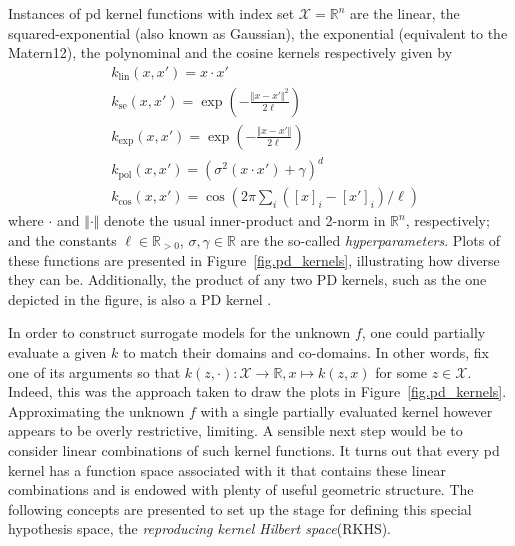 Instances of \ac{pd} kernel functions with index set $\mathcal{X} = \mathbb{R}^n$ are the linear, the squared-exponential (also known as Gaussian), the exponential (equivalent to the Matern12), the polynominal and the cosine kernels respectively given by
\begin{align}
	&k_\text{lin}(x,x') = x \cdot x' \\
	&k_\text{se}(x,x') = \exp\left(-\frac{\Vert x-x'\Vert^2}{2\ell}\right) \label{eq.se_kernel}\\
	&k_\text{exp}(x,x') = \exp\left(-\frac{\Vert x-x'\Vert}{2\ell}\right) \\
	&k_\text{pol}(x,x') = \left(\sigma^2 (x \cdot x') + \gamma \right)^d \\
	&k_\text{cos}(x,x') = \cos\left(2\pi \sum_i ([x]_i-[x']_i)/\ell \right)
\end{align}
where $\cdot$ and $\Vert \cdot \Vert$ denote the usual inner-product  and 2-norm in $\mathbb{R}^n$, respectively; and the constants $\ell \in \mathbb{R}_{>0}$, $\sigma, \gamma\in \mathbb{R}$ are the so-called \textit{hyperparameters}. Plots of these functions are presented in Figure~\ref{fig.pd_kernels}, illustrating how diverse they can be. Additionally, the product of any two PD kernels, such as the one depicted in the figure, is also a PD kernel \citep{scholkopf2002learning}. %

In order to construct surrogate models for the unknown $f$, one could partially evaluate a given $k$ to match their domains and co-domains. In other words, fix one of its arguments so that $k(z,\cdot): \mathcal{X} \rightarrow \mathbb{R}, x \mapsto k(z,x)$ for some $z \in \mathcal{X}$. Indeed, this was the approach taken to draw the plots in Figure~\ref{fig.pd_kernels}. Approximating the unknown $f$ with a single partially evaluated kernel however appears to be overly restrictive, limiting. A sensible next step would be to consider linear combinations of such kernel functions. It turns out that every \ac{pd} kernel has a function space associated with it that contains these linear combinations and is endowed with plenty of useful geometric structure. The following concepts are presented to set up the stage for defining this special hypothesis space, the \textit{reproducing kernel Hilbert space}(RKHS).

